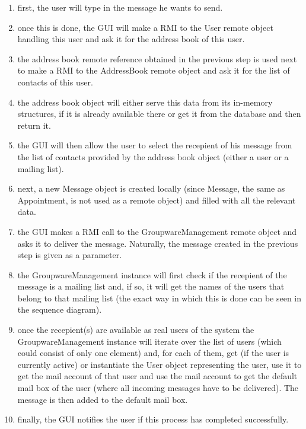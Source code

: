 \documentclass[a4paper,10pt]{article}
\begin{document}
\begin{enumerate}

\item first, the user will type in the message he wants to send.

\item once this is done, the GUI will make a RMI to the User remote object handling this user
and ask it for the address book of this user.

\item the address book remote reference obtained in the previous step is used next to make
a RMI to the AddressBook remote object and ask it for the list of contacts of this user.

\item the address book object will either serve this data from its in-memory structures, if
it is already available there or get it from the database and then return it.

\item the GUI will then allow the user to select the recepient of his message from the list
of contacts provided by the address book object (either a user or a mailing list).

\item next, a new Message object is created locally (since Message, the same as Appointment,
is not used as a remote object) and filled with all the relevant data.

\item the GUI makes a RMI call to the GroupwareManagement remote object and asks it
to deliver the message. Naturally, the message created in the previous step is given as a
parameter.

\item the GroupwareManagement instance will first check if the recepient of the message
is a mailing list and, if so, it will get the names of the users that belong to that mailing list
(the exact way in which this is done can be seen in the sequence diagram).

\item once the recepient(s) are available as real users of the system the GroupwareManagement
instance will iterate over the list of users (which could consist of only one element) and, for
each of them, get (if the user is currently active) or instantiate the User object representing
the user, use it to get the mail account of that user and use the mail account to get the default
mail box of the user (where all incoming messages have to be delivered). The message is then
added to the default mail box.

\item finally, the GUI notifies the user if this process has completed successfully.

\end{enumerate}
\end{document}
